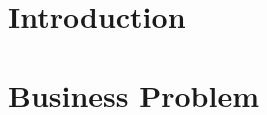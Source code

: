 \documentclass[11pt]{report}
\begin{document}
\section{Introduction}

\section{Business Problem}
\end{document}

